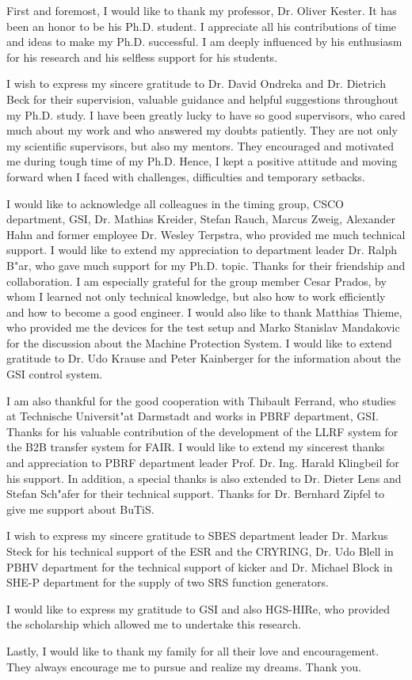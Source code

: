 First and foremost, I would like to thank my professor, Dr. Oliver Kester. It has been an honor to be his Ph.D. student. I appreciate all his contributions of time and ideas to make my Ph.D. successful. I am deeply influenced by his enthusiasm for his research and his selfless support for his students. 

I wish to express my sincere gratitude to Dr. David Ondreka and Dr. Dietrich Beck for their supervision, valuable guidance and helpful suggestions throughout my Ph.D. study. I have been greatly lucky to have so good supervisors, who cared much about my work and who answered my doubts patiently. They are not only my  scientific supervisors, but also my mentors. They encouraged and motivated me during tough time of my Ph.D. Hence, I kept a positive attitude and moving forward when I faced with challenges, difficulties and temporary setbacks.

I would like to acknowledge all colleagues in the timing group, \gls{CSCO} department, GSI, Dr. Mathias Kreider, Stefan Rauch, Marcus Zweig, Alexander Hahn and former employee Dr. Wesley Terpstra, who provided me much technical support. I would like to extend my appreciation to department leader Dr. Ralph B"ar, who gave much support for my Ph.D. topic. Thanks for their friendship and collaboration. I am especially grateful for the group member Cesar Prados, by whom I learned not only technical knowledge, but also how to work efficiently and how to become a good engineer. I would also like to thank Matthias Thieme, who provided me the devices for the test setup and Marko Stanislav Mandakovic for the discussion about the Machine Protection System. I would like to extend gratitude to Dr. Udo Krause and  Peter Kainberger for the information about the GSI control system.

I am also thankful for the good cooperation with Thibault Ferrand, who studies at Technische Universit"at Darmstadt and works in \gls{PBRF} department, GSI. Thanks for his valuable contribution of the development of the LLRF system for the B2B transfer system for FAIR. I would like to extend my sincerest thanks and appreciation to PBRF department leader Prof. Dr. Ing. Harald Klingbeil for his support. In addition, a special thanks is also extended to Dr. Dieter Lens and Stefan Sch"afer for their technical support. Thanks for Dr. Bernhard Zipfel to give me support about BuTiS.

I wish to express my sincere gratitude to \gls{SBES} department leader Dr. Markus Steck for his technical support of the ESR and the CRYRING, Dr. Udo Blell in \gls{PBHV} department for the technical support of kicker and Dr. Michael Block in \gls{SHE-P} department for the supply of two SRS function generators. 

I would like to express my gratitude to GSI and also HGS-HIRe, who provided the scholarship which allowed me to undertake this research.


Lastly, I would like to thank my family for all their love and encouragement. They always encourage me to pursue and realize my dreams. Thank you.




